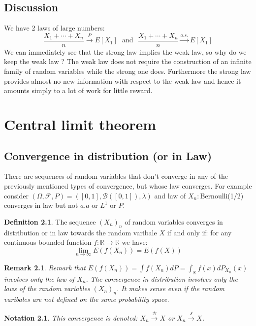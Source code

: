 \documentclass[10pt,a4paper]{book}
\newcommand{\R}{\mathbb{R}}
\newtheorem*{remark}{Remark}
\newtheorem*{notation}{Notation}
\theoremstyle{definition}
\newtheorem{definition}{Definition}[section]
\begin{document}
\section{Discussion}

We have 2 laws of large numbers:
\[
\frac{X_1 + \cdots + X_n}{n} \stackrel{P}{\longrightarrow} E[X_1] \mbox{~~and~~} \frac{X_1 + \cdots + X_n}{n} \stackrel{a.s.}{\longrightarrow} E[X_1]
\]
We can immediately see that the strong law implies the weak law, so why do we keep the weak law ? The weak law does not require the construction of an infinite family of random variables while the strong one does. Furthermore the strong law provides almost no new information with respect to the weak law and hence it amounts simply to a lot of work for little reward.

\chapter{Central limit theorem}

\section{Convergence in distribution (or in Law)}
There are sequences of random variables that don't converge in any of the previously mentioned types of convergence, but whose law converges. For example consider $(\Omega,\mathcal{F},P)=([0,1],\mathcal{B}([0,1]),\lambda)$ and law of $X_n:$Bernoulli(1/2) converges in law but not $a.a$ or $L^1$ or $P$. 

\begin{definition}
The sequence $(X_n)_n$ of random variables converges in distribution or in law towards the random varibale $X$ if and only if: for any continuous bounded function $f:\R\to\R$ we have:
$$\lim_{n\to\infty}E(f(X_n))=E(f(X))$$
\end{definition}

\begin{remark}
Remark that $E(f(X_n))=\int f(X_n)dP=\int_{\R}f(x)dP_{X_n}(x)$ involves only the law of $X_n$. The convergence in distribution involves only the laws of the random variables $(X_n)_n$. It makes sense even if the random varibales are not defined on the same probability space.
\end{remark}

\begin{notation}
This convergence is denoted: $X_n\xrightarrow[]{\mathcal{D}} X$ or $X_n \xrightarrow[]{\mathcal{l}} X$.
\end{notation}
\end{document}
